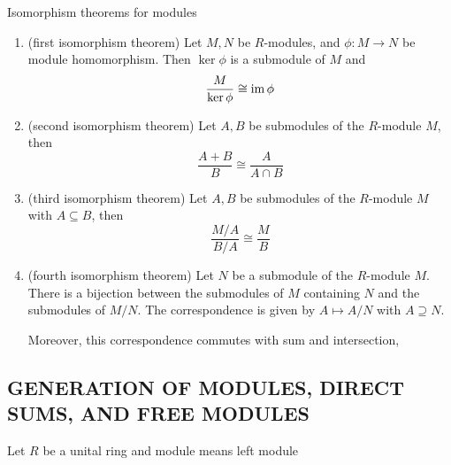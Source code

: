 \begin{theorem}
	Isomorphism theorems for modules
	\begin{enumerate}
		\item (first isomorphism theorem) Let $M, N$ be $R$-modules, and $\phi: M \to N$ be module homomorphism. Then $\ker \phi$ is a submodule of $M$ and 
		$$
			\frac{M}{\ker \phi} \cong \operatorname{im} \phi
		$$
		
		\item (second isomorphism theorem) Let $A, B$ be submodules of the $R$-module $M$, then 
		$$
			\frac{A + B}{B} \cong \frac{A}{A \cap B}
		$$
		
		\item (third isomorphism theorem) Let $A, B$ be submodules of the $R$-module $M$ with $A \subseteq B$, then
		$$
			\frac{M / A}{B / A} \cong \frac{M}{B}
		$$
		
		\item (fourth isomorphism theorem) Let $N$ be a submodule of the $R$-module $M$. There is a bijection between the submodules of $M$ containing $N$ and the submodules of $M / N$. The correspondence is given by $A \mapsto A / N$ with $A \supseteq N$.
		
		Moreover, this correspondence commutes with sum and intersection, 
	\end{enumerate}
\end{theorem}

\subsection{GENERATION OF MODULES, DIRECT SUMS, AND FREE MODULES}

\begin{remark}
	Let $R$ be a unital ring and module means left module
\end{remark}

